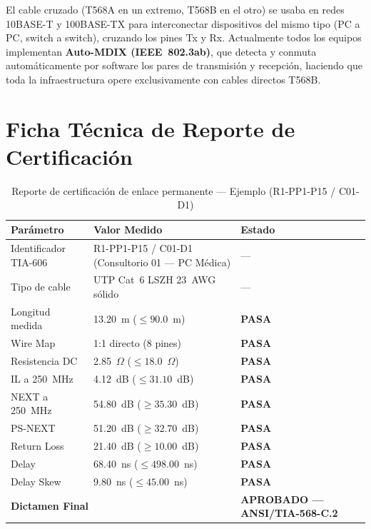 El cable cruzado (T568A en un extremo, T568B en el otro) se usaba en redes 10BASE-T y 100BASE-TX para interconectar dispositivos del mismo tipo (PC a PC, switch a switch), cruzando los pines Tx y Rx. Actualmente todos los equipos implementan \textbf{Auto-MDIX (IEEE~802.3ab)}, que detecta y conmuta automáticamente por software los pares de transmisión y recepción, haciendo que toda la infraestructura opere exclusivamente con cables directos T568B.

\section{Ficha Técnica de Reporte de Certificación}

\begin{table}[H]
\centering
\caption{Reporte de certificación de enlace permanente --- Ejemplo (R1-PP1-P15 / C01-D1)}
\small
\begin{tabularx}{\textwidth}{@{}lXl@{}}
\toprule
\textbf{Parámetro} & \textbf{Valor Medido} & \textbf{Estado} \\
\midrule
Identificador TIA-606 & R1-PP1-P15 / C01-D1 (Consultorio 01 --- PC Médica) & --- \\
Tipo de cable         & UTP Cat~6 LSZH 23~AWG sólido                       & --- \\
Longitud medida       & 13.20~m ($\leq 90.0$~m)                             & \textbf{PASA} \\
Wire Map              & 1:1 directo (8 pines)                               & \textbf{PASA} \\
Resistencia DC        & 2.85~$\Omega$ ($\leq 18.0$~$\Omega$)                & \textbf{PASA} \\
IL a 250~MHz          & 4.12~dB ($\leq 31.10$~dB)                          & \textbf{PASA} \\
NEXT a 250~MHz        & 54.80~dB ($\geq 35.30$~dB)                         & \textbf{PASA} \\
PS-NEXT               & 51.20~dB ($\geq 32.70$~dB)                         & \textbf{PASA} \\
Return Loss           & 21.40~dB ($\geq 10.00$~dB)                         & \textbf{PASA} \\
Delay                 & 68.40~ns ($\leq 498.00$~ns)                        & \textbf{PASA} \\
Delay Skew            & 9.80~ns ($\leq 45.00$~ns)                          & \textbf{PASA} \\
\midrule
\multicolumn{2}{l}{\textbf{Dictamen Final}} & \textbf{APROBADO --- ANSI/TIA-568-C.2} \\
\bottomrule
\end{tabularx}
\label{tab:test-report}
\end{table}
